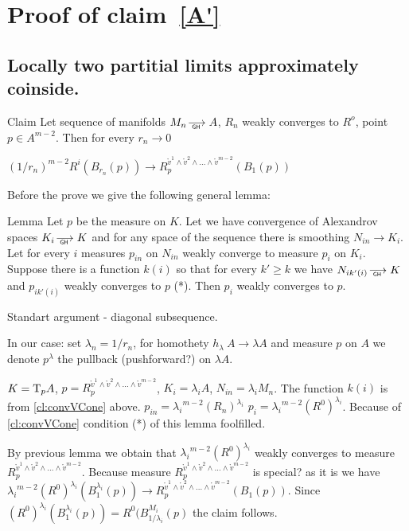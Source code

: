 \documentclass[a4paper,10pt]{article}
\begin{document}
\section{Proof of claim~\ref{A'}}\label{sec:codim2}
\subsection{Locally two partitial limits approximately coinside.}
\begin{thm}{Claim}\label{cl:convLocCodim2}
Let sequence of manifolds $M_n\GHto A$,
$R_n$ weakly converges to $R^o$,
point $p\in A^{m-2}$. Then
for every  $r_n\to 0$

$(1/r_n)^{m-2}R^i(B_{r_n}(p))\to R_p^{\mathring{v}^1\wedge \mathring{v}^2\wedge\dots\wedge \mathring{v}^{m-2}}(B_{1}(p))$

\end{thm}

Before the prove we give the following general lemma:

\begin{thm}{Lemma}
Let $p $ be the measure on $K$.
Let we have convergence of Alexandrov spaces $K_i\GHto K$
  and for  any space of the sequence there is smoothing $N_{in}\to  K_i$.
Let for every $i$ measures $p_{in}$ on $N_{in}$ weakly
converge to measure $p_i$ on $K_i$.
Suppose there is a function $k(i)$ so that
for every $k'\ge k$ we
have $N_{i k'(i)}\GHto K$ and
$p_{i k'(i)}$ weakly converges to $p$ (*).
Then $p_i$ weakly converges to $p$.

\end{thm}

 Standart argument - diagonal subsequence. \qeds

In our case: set $\lambda_n=1/r_n$,
for homothety $h_\lambda\:A\to \lambda A$ and measure
$p$ on $A$ we denote $p^\lambda$ the pullback (pushforward?) on  $\lambda A$.


$K={\text{\rm T}_p A}$, $p=R_p^{\mathring{v}^1\wedge \mathring{v}^2\wedge\dots\wedge
\mathring{v}^{m-2}}$,  $K_i={\lambda_i A}$,
$N_{in}=\lambda_i M_n$. The function $k(i)$ is
from \ref{cl:convVCone} above.
$p_{in}={\lambda_i}^{m-2}(R_n)^{\lambda_i}$
$p_i={\lambda_i}^{m-2}(R^0)^{\lambda_i}$.
Because of \ref{cl:convVCone} condition (*) of this lemma foolfilled.

By previous lemma we obtain that
${\lambda_i}^{m-2}(R^0)^{\lambda_i}$ weakly converges to measure
$R_p^{\mathring{v}^1\wedge \mathring{v}^2\wedge\dots\wedge
\mathring{v}^{m-2}}$.
Because measure $R_p^{\mathring{v}^1\wedge \mathring{v}^2\wedge\dots\wedge
\mathring{v}^{m-2}}$ is special? as  it is
we have ${\lambda_i}^{m-2}(R^0)^{\lambda_i}(B_1^{\lambda_i}(p))\to R_p^{\mathring{v}^1\wedge \mathring{v}^2\wedge\dots\wedge \mathring{v}^{m-2}}(B_{1}(p))$.
Since $(R^0)^{\lambda_i}(B_1^{\lambda_i}(p))=R^0(B_{1/\lambda_i}^{M_i}(p)$
the claim follows.
\qeds
\end{document}
